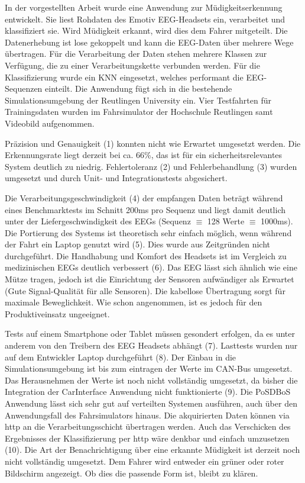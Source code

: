 \label{chap:result}
In der vorgestellten Arbeit wurde eine Anwendung zur Müdigkeitserkennung entwickelt. Sie liest Rohdaten des Emotiv EEG-Headsets ein, verarbeitet und klassifiziert sie. Wird Müdigkeit erkannt, wird dies dem Fahrer mitgeteilt. 
Die Datenerhebung ist lose gekoppelt und kann die EEG-Daten über mehrere Wege übertragen. Für die Verarbeitung der Daten stehen mehrere Klassen zur Verfügung, die zu einer Verarbeitungskette verbunden werden. Für die Klassifizierung wurde ein KNN eingesetzt, welches performant die EEG-Sequenzen einteilt. Die Anwendung fügt sich in die bestehende Simulationsumgebung der Reutlingen University ein.
Vier Testfahrten für Trainingsdaten wurden im Fahrsimulator der Hochschule Reutlingen samt Videobild aufgenommen.

Präzision und Genauigkeit (1) konnten nicht wie Erwartet umgesetzt werden. Die Erkennungsrate liegt derzeit bei ca. 66\%, das ist für ein sicherheitsrelevantes System deutlich zu niedrig. 
Fehlertoleranz (2) und Fehlerbehandlung (3) wurden umgesetzt und durch Unit- und Integrationstests abgesichert. 

Die Verarbeitungsgeschwindigkeit (4) der empfangen Daten beträgt  während eines Benchmarktests im Schnitt 200ms pro Sequenz und liegt damit deutlich unter der Liefergeschwindigkeit des EEGs (Sequenz $\equiv$ 128 Werte $\equiv$ 1000ms). 
Die Portierung des Systems ist theoretisch sehr einfach möglich, wenn während der Fahrt ein Laptop genutzt wird (5). Dies wurde aus Zeitgründen nicht durchgeführt. Die Handhabung und Komfort des Headsets ist im Vergleich zu medizinischen EEGs deutlich verbessert (6). Das EEG lässt sich ähnlich wie eine Mütze tragen, jedoch ist die Einrichtung der Sensoren aufwändiger als Erwartet (Gute Signal-Qualität für alle Sensoren). Die kabellose Übertragung sorgt für maximale Beweglichkeit. Wie schon angenommen, ist es jedoch für den Produktiveinsatz ungeeignet.

Tests auf einem Smartphone oder Tablet müssen gesondert erfolgen, da es unter anderem von den Treibern des EEG Headsets abhängt (7). Lasttests wurden nur auf dem Entwickler Laptop durchgeführt (8). Der Einbau in die Simulationsumgebung ist bis zum eintragen der Werte im CAN-Bus umgesetzt. Das Herausnehmen der Werte ist noch nicht vollständig umgesetzt, da bisher die Integration der CarInterface Anwendung nicht funktionierte (9). Die PoSDBoS Anwendung lässt sich sehr gut auf verteilten Systemen ausführen, auch über den Anwendungsfall des Fahrsimulators hinaus. Die akquirierten Daten können via http an die Verarbeitungsschicht übertragen werden. Auch das Verschicken des Ergebnisses der Klassifizierung per http wäre denkbar und einfach umzusetzen (10). Die Art der Benachrichtigung über eine erkannte Müdigkeit ist derzeit noch nicht vollständig umgesetzt. Dem Fahrer wird entweder ein grüner oder roter Bildschirm angezeigt. Ob dies die passende Form ist, bleibt zu klären.

